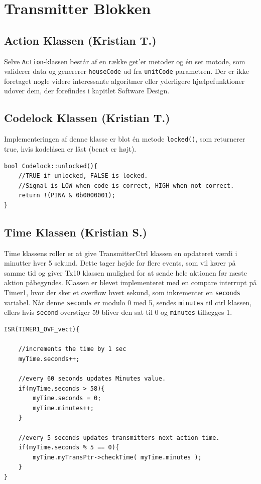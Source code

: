 
\section{Transmitter Blokken}

\subsection{Action Klassen (Kristian T.)}

Selve \texttt{Action}-klassen består af en række get'er metoder og én set motode, som validerer data og genererer \texttt{houseCode} ud fra \texttt{unitCode} parametren. Der er ikke foretaget nogle videre interessante algoritmer eller yderligere hjælpefunktioner udover dem, der forefindes i kapitlet Software Design.

\subsection{Codelock Klassen (Kristian T.)}

Implementeringen af denne klasse er blot én metode \texttt{locked()}, som returnerer true, hvis kodelåsen er låst (benet er højt).

\begin{lstlisting}
bool Codelock::unlocked(){
	//TRUE if unlocked, FALSE is locked. 
	//Signal is LOW when code is correct, HIGH when not correct.
	return !(PINA & 0b0000001);
}
\end{lstlisting}

\subsection{Time Klassen (Kristian S.)}

Time klassens roller er at give TransmitterCtrl klassen en opdateret værdi i minutter hver 5 sekund. Dette tager højde for flere events, som vil kører på samme tid og giver Tx10 klassen mulighed for at sende hele aktionen før næste aktion påbegyndes. Klassen er blevet implementeret med en compare interrupt på Timer1, hvor der sker et overflow hvert sekund, som inkrementer en \texttt{seconds} variabel. Når denne \texttt{seconds} er modulo 0 med 5, sendes \texttt{minutes} til ctrl klassen, ellers hvis \texttt{second} overstiger 59 bliver den sat til 0 og \texttt{minutes} tillægges 1. 

\begin{lstlisting}
ISR(TIMER1_OVF_vect){
	
	//increments the time by 1 sec
	myTime.seconds++;
	
	//every 60 seconds updates Minutes value.
	if(myTime.seconds > 58){
	    myTime.seconds = 0;
		myTime.minutes++;
	}
		
	//every 5 seconds updates transmitters next action time.
	if(myTime.seconds % 5 == 0){
		myTime.myTransPtr->checkTime( myTime.minutes );
	}
}
\end{lstlisting}


